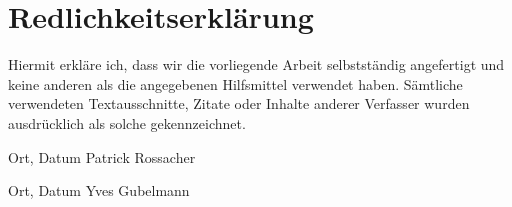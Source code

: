 \newpage
\section*{Redlichkeitserklärung}

Hiermit erkläre ich, dass wir die vorliegende Arbeit selbstständig angefertigt und keine anderen als die angegebenen Hilfsmittel verwendet haben. Sämtliche verwendeten Textausschnitte, Zitate oder Inhalte anderer Verfasser wurden ausdrücklich als solche gekennzeichnet. 
\vspace{2cm}

\textemdash\textemdash\textemdash\textemdash\textemdash\textemdash
\textemdash\textemdash\textemdash\textemdash\textemdash\textemdash
\hspace{2.2cm}
\textemdash\textemdash\textemdash\textemdash\textemdash\textemdash
\textemdash\textemdash\textemdash\textemdash\textemdash\textemdash
\textemdash\textemdash\textemdash\textemdash\textemdash\textemdash
\newline
Ort, Datum 
\hspace{5cm} 
Patrick Rossacher

\vspace{2cm}

\textemdash\textemdash\textemdash\textemdash\textemdash\textemdash
\textemdash\textemdash\textemdash\textemdash\textemdash\textemdash
\hspace{2.2cm}
\textemdash\textemdash\textemdash\textemdash\textemdash\textemdash
\textemdash\textemdash\textemdash\textemdash\textemdash\textemdash
\textemdash\textemdash\textemdash\textemdash\textemdash\textemdash
\newline
Ort, Datum 
\hspace{5cm} 
Yves Gubelmann


